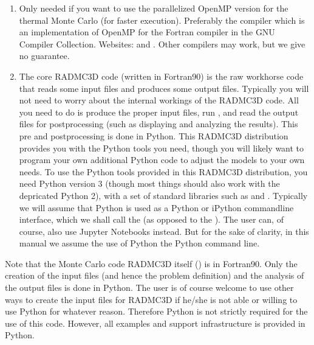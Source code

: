 \documentclass[letterpaper,10pt,english]{sphinxmanual}
\begin{document}
\begin{enumerate}
\item {} 

Only needed if you want to use the parallelized OpenMP version for the thermal
Monte Carlo (for faster execution). Preferably the 
compiler which is an implementation of OpenMP for the Fortran compiler in the
GNU Compiler Collection. Websites:  and
. Other compilers may work, but we give no
guarantee.

\item {} 

The core RADMC\sphinxhyphen{}3D code  (written in Fortran\sphinxhyphen{}90) is the
raw workhorse code that reads some input files and produces some output
files. Typically you will not need to worry about the internal workings of the
RADMC\sphinxhyphen{}3D code. All you need to do is produce the proper input files, run
, and read the output files for post\sphinxhyphen{}processing (such as
displaying and analyzing the results). This pre\sphinxhyphen{} and post\sphinxhyphen{}processing is
done in Python. This RADMC\sphinxhyphen{}3D distribution provides you with the Python tools
you need, though you will likely want to program your own additional Python code
to adjust the models to your own needs. To use the Python tools provided in
this RADMC\sphinxhyphen{}3D distribution, you need Python version 3
(though most things should also work with the depricated Python 2), with a
set of standard libraries such as  and .
Typically we will assume that Python is used as a Python or iPython command\sphinxhyphen{}line
interface, which we shall call the  (as opposed to the
). The user can, of course, also use Jupyter Notebooks instead.
But for the sake of clarity, in this manual we assume the use of Python the
Python command line.

\end{enumerate}

Note that the Monte Carlo code RADMC\sphinxhyphen{}3D itself () is in Fortran\sphinxhyphen{}90. Only the
creation of the input files (and hence the problem definition) and the analysis
of the output files is done in Python. The user is of course welcome to use
other ways to create the input files for RADMC\sphinxhyphen{}3D if he/she is not able or
willing to use Python for whatever reason. Therefore Python is not strictly
required for the use of this code. However, all examples and support
infrastructure is provided in Python.
\end{document}
